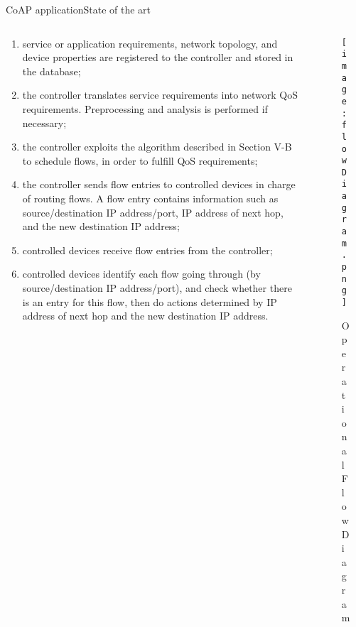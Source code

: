 \begin{frame}{CoAP application}{State of the art}
	\begin{columns}
	
		\begin{column}{0.5\textwidth}
			\begin{enumerate}
				\item service or application requirements, network topology, and device properties are registered to the controller and stored in the database;
				\item the controller translates service requirements into network QoS requirements. Preprocessing and analysis is performed if necessary;
				\item the controller exploits the algorithm described in Section V-B to schedule flows, in order to fulfill QoS requirements;
				\item the controller sends flow entries to controlled devices in charge of routing flows. A flow entry contains information such as source/destination IP address/port, IP address of next hop, and the new destination IP address;
				\item controlled devices receive flow entries from the controller;
				\item controlled devices identify each flow going through (by source/destination IP address/port), and check whether there is an entry for this flow, then do actions determined by IP address of next hop and the new destination IP address.
				
			\end{enumerate}
			
		\end{column}
		
		\begin{column}{0.5\textwidth}
			\begin{center}
			
				\begin{figure}
					\texttt{[image: flowDiagram.png]}
					\caption{\label{fig:flowDiagram.png} Operational Flow Diagram}
				\end{figure}
				
			\end{center}
		\end{column}
		
	\end{columns}
	
\end{frame}

